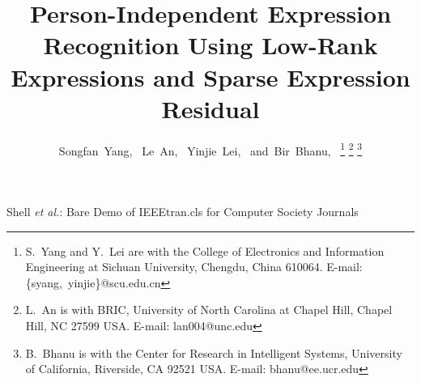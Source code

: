 \documentclass[journal]{IEEEtran}
\begin{document}
%
\title{Person-Independent Expression Recognition Using Low-Rank Expressions and Sparse Expression Residual}
%
%
%

\author{Songfan~Yang,~
				Le~An,~
				Yinjie~Lei,~
        and~Bir~Bhanu,~%
\thanks{S.~Yang and Y.~Lei are with the College of Electronics and Information Engineering at Sichuan University, Chengdu, China 610064. E-mail: \{syang,~yinjie\}@scu.edu.cn}
\thanks{L.~An is with BRIC, University of North Carolina at Chapel Hill, Chapel Hill, NC 27599 USA. E-mail: lan004@unc.edu}
\thanks{B.~Bhanu is with the Center for Research in Intelligent Systems, University of California, Riverside, CA 92521 USA. E-mail: bhanu@ee.ucr.edu}
}


%
{Shell \MakeLowercase{\textit{et al.}}: Bare Demo of
IEEEtran.cls for Computer Society Journals}
\maketitle
\end{document}
